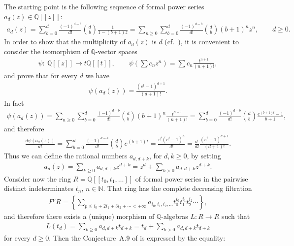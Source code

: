 \documentclass[pdftex]{sigma}
\newcommand{\N}{\mathbb{N}}
\newcommand{\Q}{\mathbb{Q}}
\numberwithin{equation}{section}
\begin{document}
\begin{Remark}
The starting point is the following sequence of formal power series $a_d(z)\in \Q[[z]]$:
\begin{gather*} a_d(z)=\sum_{b=0}^{d}\frac{(-1)^{d-b}}{d!}\binom{d}{b}\frac{1}{1-(b+1)z}=
\sum_{n\ge 0}\sum_{b=0}^{d}\frac{(-1)^{d-b}}{d!}\binom{d}{b}(b+1)^nz^n,\qquad d\ge 0 .\end{gather*}
In order to show that the multiplicity of $a_d(z)$ is $d$ (cf.~\cite[Proposition~2.1]{SZ}), it is convenient to consider the isomorphism of $\Q$-vector spaces
\begin{gather*} \psi\colon \ \Q[[z]]\to t\Q[[t]],\qquad \psi\left(\sum c_nz^n\right)=\sum c_n \frac{t^{n+1}}{ (n+1)! },\end{gather*}
and prove that for every $d$ we have
\begin{gather}\label{equ.psiadi}
\psi(a_d(z))=\frac{(e^t-1)^{d+1}}{(d+1)!} .\end{gather}
In fact
\begin{gather*} \psi(a_d(z))=\sum_{n\ge 0}\sum_{b=0}^{d}\frac{(-1)^{d-b}}{d!}\binom{d}{b}(b+1)^n\frac{t^{n+1}}{(n+1)!}=
\sum_{b=0}^{d}\frac{(-1)^{d-b}}{d!}\binom{d}{b}\frac{e^{(b+1)t}-1}{b+1}, \end{gather*}
and therefore
\begin{gather*} \frac{d\psi(a_d(z))}{dt}=
\sum_{b=0}^{d}\frac{(-1)^{d-b}}{d!}\binom{d}{b}e^{(b+1)t}=\frac{e^t(e^t-1)^d}{d!}=
\frac{d~}{dt}\frac{(e^t-1)^{d+1}}{(d+1)!} .\end{gather*}
Thus we can def\/ine the rational numbers $a_{d,d+k}$, for $d,k\ge 0$, by setting
\begin{gather*} a_d(z)=\sum_{k\ge 0} a_{d,d+k}z^{d+k}=z^d+\sum_{k>0} a_{d,d+k}z^{d+k} .\end{gather*}
Consider now the ring $R=\Q[[t_0,t_1,\ldots]]$ of formal power series in the pairwise distinct indeterminates $t_n$, $n\in \N$. That ring
has the complete decreasing f\/iltration
\begin{gather*} F^pR=\left\{ \sum_{p\le i_0+2i_1+3i_2+\cdots<+\infty} a_{i_0,i_1,i_2,\ldots} t_0^{i_0}t_1^{i_1}t_2^{i_2}\cdots\right\},\end{gather*}
and therefore there exists a (unique) morphism of $\Q$-algebras $L\colon R\to R$ such that
\begin{gather*} L(t_d)=\sum_{k\ge 0}a_{d,d+k}t_{d+k}=t_d+\sum_{k>0}a_{d,d+k}t_{d+k}\end{gather*}
for every $d\ge 0$. Then the Conjecture~A.9 of \cite{SZ} is expressed by the equality:
\begin{gather}\label{equ.congA9}

\end{gather}
\end{Remark}
\end{document}
